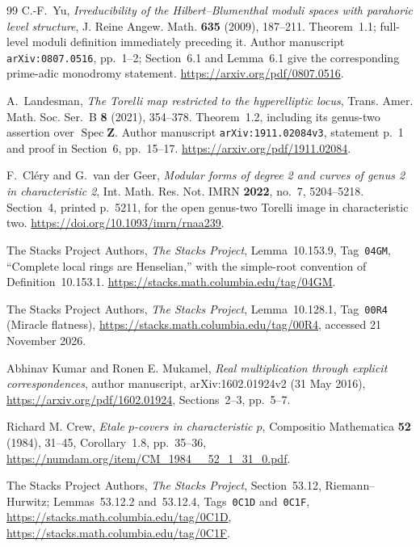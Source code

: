 \begin{thebibliography}{99}
C.-F.~Yu,
\emph{Irreducibility of the Hilbert--Blumenthal moduli spaces
with parahoric level structure},
J. Reine Angew. Math. \textbf{635} (2009), 187--211.
Theorem~1.1; full-level moduli definition immediately preceding it.
Author manuscript \texttt{arXiv:0807.0516}, pp.~1--2;
Section~6.1 and Lemma~6.1 give the corresponding
prime-adic monodromy statement.
\url{https://arxiv.org/pdf/0807.0516}.

A.~Landesman,
\emph{The Torelli map restricted to the hyperelliptic locus},
Trans. Amer. Math. Soc. Ser.~B \textbf{8} (2021), 354--378.
Theorem~1.2, including its genus-two assertion over
$\operatorname{Spec}\mathbf Z$.
Author manuscript \texttt{arXiv:1911.02084v3},
statement p.~1 and proof in Section~6, pp.~15--17.
\url{https://arxiv.org/pdf/1911.02084}.

F.~Cl\'ery and G.~van der Geer,
\emph{Modular forms of degree 2 and curves of genus 2 in
characteristic 2},
Int. Math. Res. Not. IMRN \textbf{2022}, no.~7, 5204--5218.
Section~4, printed p.~5211, for the open genus-two Torelli image
in characteristic two.
\url{https://doi.org/10.1093/imrn/rnaa239}.

The Stacks Project Authors,
\emph{The Stacks Project}, Lemma~10.153.9,
Tag~\texttt{04GM}, ``Complete local rings are Henselian,''
with the simple-root convention of Definition~10.153.1.
\url{https://stacks.math.columbia.edu/tag/04GM}.

The Stacks Project Authors, \emph{The Stacks Project},
Lemma~10.128.1, Tag~\texttt{00R4} (Miracle flatness),
\url{https://stacks.math.columbia.edu/tag/00R4},
accessed 21 November 2026.

Abhinav Kumar and Ronen E. Mukamel,
\emph{Real multiplication through explicit correspondences},
author manuscript, arXiv:1602.01924v2 (31 May 2016),
\url{https://arxiv.org/pdf/1602.01924},
Sections~2--3, pp.~5--7.

Richard M. Crew, \emph{Etale $p$-covers in characteristic $p$},
Compositio Mathematica \textbf{52} (1984), 31--45,
Corollary~1.8, pp.~35--36,
\url{https://numdam.org/item/CM_1984__52_1_31_0.pdf}.

The Stacks Project Authors, \emph{The Stacks Project},
Section~53.12, Riemann--Hurwitz;
Lemmas~53.12.2 and~53.12.4, Tags~\texttt{0C1D} and~\texttt{0C1F},
\url{https://stacks.math.columbia.edu/tag/0C1D},
\url{https://stacks.math.columbia.edu/tag/0C1F}.


\end{thebibliography}
